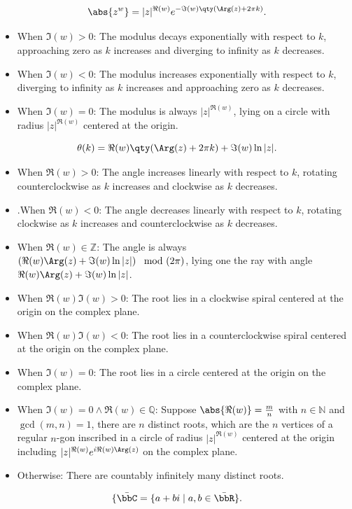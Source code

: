 \documentclass[a4paper,12pt]{article}
\begin{document}
\[\abs{z^w}=|z|^{\Re(w)}e^{-\Im(w)\qty(\Arg(z)+2\pi k)}.\]
\begin{itemize}
\item When $\Im(w) > 0$: The modulus decays exponentially with respect to $k$, approaching zero as $k$ increases and diverging to infinity as $k$ decreases.
\item When $\Im(w) < 0$: The modulus increases exponentially with respect to $k$, diverging to infinity as $k$ increases and approaching zero as $k$ decreases.
\item When $\Im(w) = 0$: The modulus is always $|z|^{\Re(w)}$, lying on a circle with radius $|z|^{\Re(w)}$ centered at the origin.
\end{itemize}
\[\theta(k)=\Re(w)\qty(\Arg(z)+2\pi k)+\Im(w)\ln|z|.\]
\begin{itemize}
\item When $\Re(w) > 0$: The angle increases linearly with respect to $k$, rotating counterclockwise as $k$ increases and clockwise as $k$ decreases.
\item.When $\Re(w) < 0$: The angle decreases linearly with respect to $k$, rotating clockwise as $k$ increases and counterclockwise as $k$ decreases.
\item When $\Re(w) \in \mathbb{Z}$: The angle is always $\left(\Re(w)\Arg(z)+\Im(w)\ln|z|\right)\mod (2\pi)$, lying one the ray with angle $\Re(w)\Arg(z)+\Im(w)\ln|z|$.
\end{itemize}
\begin{itemize}
\item When $\Re(w)\Im(w)>0$: The root lies in a clockwise spiral centered at the origin on the complex plane.
\item When $\Re(w)\Im(w)<0$: The root lies in a counterclockwise spiral centered at the origin on the complex plane.
\item When $\Im(w)=0$: The root lies in a circle centered at the origin on the complex plane.
\end{itemize}
\begin{itemize}
\item When $\Im(w)=0\land\Re(w)\in\mathbb{Q}$: Suppose $\abs{\Re(w)}=\frac{m}{n}$ with $n\in\mathbb{N}$ and $\gcd(m,n)=1$, there are $n$ distinct roots, which are the $n$ vertices of a regular $n$-gon inscribed in a circle of radius $|z|^{\Re(w)}$ centered at the origin including $|z|^{\Re(w)}e^{i\Re(w)\Arg(z)}$ on the complex plane.
\item Otherwise: There are countably infinitely many distinct roots.
\end{itemize}
\[\{\bar{\bbC}=\{a+bi\mid a,b\in\bar{\bbR}\}.\]
\end{document}
